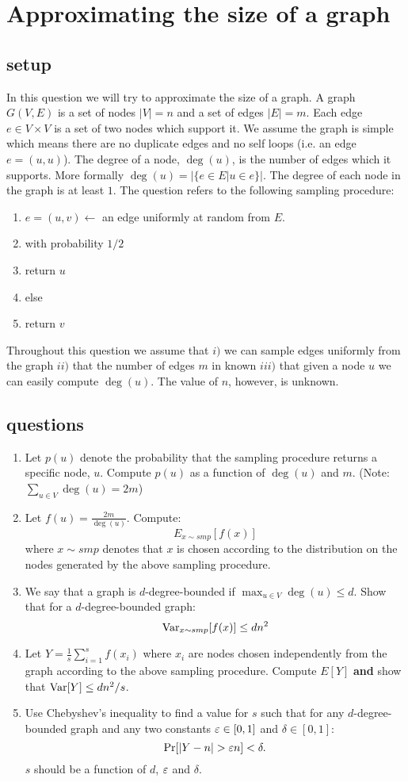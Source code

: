 \documentclass{article}
\begin{document}
\section{Approximating the size of a graph}

\subsection*{setup}

In this question we will try to approximate the size of a graph. A
graph $G(V,E)$ is a set of nodes $|V| = n$ and a set of edges $|E| =
m$. Each edge $e \in V\times V$ is a set of two nodes which support
it. We assume the graph is simple which means there are no duplicate
edges and no self loops (i.e. an edge $e=(u,u)$). The degree of a
node, $\deg(u)$, is the number of edges which it supports. More formally
$\deg(u) = |\{e \in E | u \in e\}|$. The degree of each node in the
graph is at least $1$. The question refers to the following sampling
procedure:
\begin{enumerate}
\item $e = (u,v) \leftarrow$ an edge uniformly at random from $E$.
\item with probability $1/2$
\item \tab return $u$
\item else
\item \tab return $v$
\end{enumerate}
Throughout this question we assume that $i)$ we can sample edges
uniformly from the graph $ii)$ that the number of edges $m$ in known $iii)$
that given a node $u$ we can easily compute  $\deg(u)$. The value of $n$,
however, is unknown.
\subsection*{questions}

\begin{enumerate}
\item Let $p(u)$ denote the probability that the sampling procedure returns a specific
node, $u$. Compute $p(u)$ as a function of $\deg(u)$ and $m$. (Note:
$\sum_{u \in V} \deg(u) = 2m$)
\item Let $f(u) = \frac{2m}{\deg(u)}$. Compute:
\[
E_{x \sim smp} [f(x)]
\]
where $x \sim smp$ denotes that $x$ is chosen according to the
distribution on the nodes generated by the above sampling procedure.
\item We say that a graph is $d$-degree-bounded if $\max_{u \in V} \deg(u) \le
d$. Show that for a $d$-degree-bounded graph:
\[
{\operatorname{Var}}_{x \sim smp} [f(x)] \le dn^2
\]
\item Let $Y = \frac{1}{s}\sum_{i=1}^{s} f(x_i)$ where $x_i$ are
nodes chosen independently from the graph according to the above
sampling procedure. Compute $E[Y]$ {\bf and} show that ${\operatorname{Var}}[Y] \le
dn^2/s$.
\item Use Chebyshev's inequality to find a value for $s$ such that 
for any $d$-degree-bounded graph and any two constants $\varepsilon \in
[0,1]$ and $\delta \in [0,1]$:
\[
\Pr[|Y - n| > \varepsilon n ] < \delta.
\]
$s$ should be a function of $d$, $\varepsilon$ and $\delta$.

\end{enumerate}
\pagebreak
\end{document}
